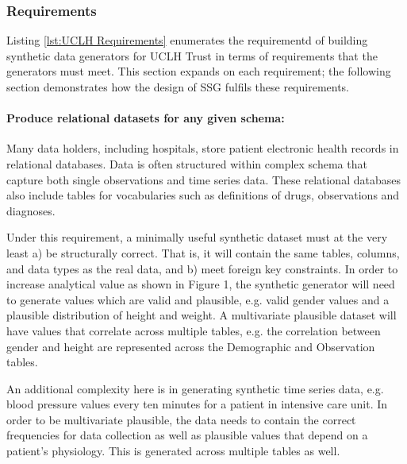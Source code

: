 \documentclass[11pt]{article}
\begin{document}
\subsubsection{Requirements}

Listing \ref{lst:UCLH Requirements} enumerates the requirementd of building synthetic data generators for UCLH Trust in terms of requirements that the generators must meet. This section expands on each requirement; the following section demonstrates how the design of SSG fulfils these requirements.


\paragraph{Produce relational datasets for any given schema:}

Many data holders, including hospitals, store patient electronic health records in relational databases. Data is often structured within complex schema that capture both single observations and time series data. These relational databases also include tables for vocabularies such as definitions of drugs, observations and diagnoses. 

Under this requirement, a minimally useful synthetic dataset must at the very least a) be structurally correct. That is, it will contain the same tables, columns, and data types as the real data, and b) meet foreign key constraints. In order to increase analytical value as shown in Figure 1, the synthetic generator will need to generate values which are valid and plausible, e.g. valid gender values and a plausible distribution of height and weight.  A multivariate plausible dataset will have values that correlate across multiple tables, e.g. the correlation between gender and height are represented across the Demographic and Observation tables. 

An additional complexity here is in generating synthetic time series data, e.g. blood pressure values every ten minutes for a patient in intensive care unit. In order to be multivariate plausible, the data needs to contain the correct frequencies for data collection as well as plausible values that depend on a patient's physiology. This is generated across multiple tables as well.  
\end{document}
